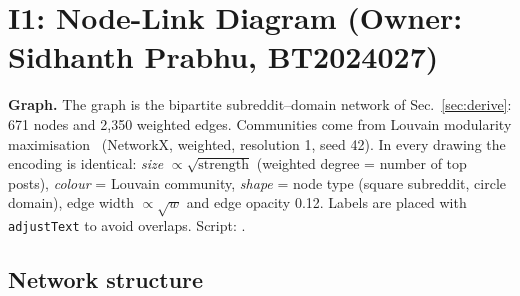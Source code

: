 \section{I1: Node-Link Diagram (Owner: Sidhanth Prabhu, BT2024027)}
\label{sec:i1}
\textbf{Graph.} The graph is the bipartite subreddit--domain network of Sec.~\ref{sec:derive}: 671 nodes and 2,350 weighted
edges. Communities come from Louvain modularity maximisation~\cite{blondel2008} (NetworkX, weighted, resolution 1, seed 42).
In every drawing the encoding is identical: \emph{size} $\propto\sqrt{\text{strength}}$ (weighted degree = number of top
posts), \emph{colour} = Louvain community, \emph{shape} = node type (square subreddit, circle domain), edge width
$\propto\sqrt{w}$ and edge opacity 0.12. Labels are placed with \texttt{adjustText} to avoid overlaps. Script:
.

\subsection{Network structure}



